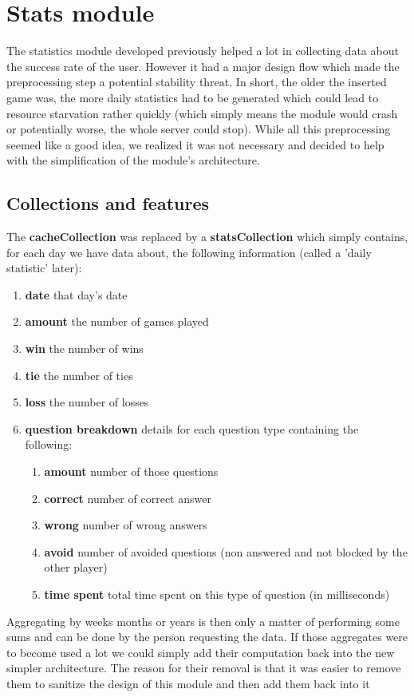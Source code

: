 \section{Stats module}
The statistics module developed previously helped a lot in collecting data about the success rate of the user. However it had a major design flow which made the preprocessing step a potential stability threat. In short, the older the inserted game was, the more daily statistics had to be generated which could lead to resource starvation rather quickly (which simply means the module would crash or potentially worse, the whole server could stop). While all this preprocessing seemed like a good idea, we realized it was not necessary and decided to help with the simplification of the module's architecture.
\subsection{Collections and features}
The \textbf{cacheCollection} was replaced by a \textbf{statsCollection} which simply contains, for each day we have data about, the following information (called a 'daily statistic' later):
\begin{enumerate}
	\item \textbf{date} that day's date
	\item \textbf{amount} the number of games played
	\item \textbf{win} the number of wins
	\item \textbf{tie} the number of ties
	\item \textbf{loss} the number of losses
	\item \textbf{question breakdown} details for each question type containing the following:
	\begin{enumerate}
		\item \textbf{amount} number of those questions
		\item \textbf{correct} number of correct answer
		\item \textbf{wrong} number of wrong answers
		\item \textbf{avoid} number of avoided questions (non answered and not blocked by the other player)
		\item \textbf{time spent} total time spent on this type of question (in milliseconds)
	\end{enumerate}
\end{enumerate}
Aggregating by weeks months or years is then only a matter of performing some sums and can be done by the person requesting the data. If those aggregates were to become used a lot we could simply add their computation back into the new simpler architecture. The reason for their removal is that it was easier to remove them to sanitize the design of this module and then add them back into it\\
